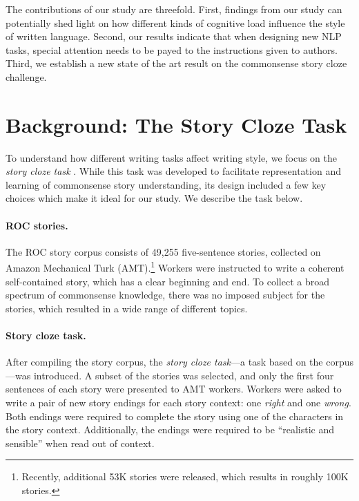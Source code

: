 \documentclass[11pt,a4paper]{article}
\newcommand{\secref}[1]{Section~\ref{ssec:#1}}
\newcommand{\isection}[2]{\section{#1}\label{ssec:#2}}
\newcommand{\com}[1]{}
\newcommand{\clinic}[1]{{\color{magenta}\textsc{[#1 --CLINIC]}}}
\begin{document}
The contributions of our study are threefold. 
First, findings from our study can potentially shed light on 
how different kinds of cognitive load influence the style of written language. 
Second, our results indicate that when designing new NLP tasks, special attention needs to be payed to the instructions given to authors.
Third, we establish a new state of the art result on the commonsense story cloze challenge. 

\com{
The remainder of this paper is organized as follows. In \secref{ROC_Story} we describe the story cloze task.
We then present our model, experiments and results in Sections \ref{ssec:Model}, \ref{ssec:Experiments} and \ref{ssec:Results} respectively.
Sections \ref{ssec:Ablation} and \ref{ssec:Discussion} present a further analysis of our results  and a discussion, followed by related work and conclusions.\clinic{Omit this paragraph?}}

\isection{Background: The Story Cloze Task}{ROC_Story}
To understand how different writing tasks affect writing style, 
we focus on the \textit{story cloze task} \cite{Mostafazadeh:2016}. 
While this task was developed to facilitate representation and learning of commonsense story understanding,
its design included a few key choices which  make it ideal for our study. 
We describe the task below.




\paragraph{ROC stories.}

The ROC story corpus consists of 49,255 five-sentence 
stories, collected on Amazon Mechanical Turk (AMT).\footnote{Recently,
  additional 53K stories were released, which results in roughly
  100K stories.}
Workers were instructed to write a coherent self-contained story, which has a clear beginning and end. 
To collect a broad spectrum of commonsense knowledge, there was no imposed subject for the stories,
which resulted in a wide range of different topics.

\paragraph{Story cloze task.}
After compiling the story corpus, the {\it story cloze task}---a task based on the corpus---was introduced.
A subset of the stories was selected, and only the first four sentences of each story were presented to AMT workers.
Workers were asked to write a pair of new story endings for each story context: one {\it right} and one {\it wrong}.
Both endings were required to complete the story using one of the characters in the story context. 
Additionally,  the endings were required to be ``realistic and sensible'' \cite{Mostafazadeh:2016} when read out of context.
\end{document}
